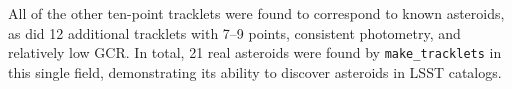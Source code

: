 All of the other ten-point tracklets were found to correspond to known asteroids, as did 12 additional tracklets with 7--9 points, consistent photometry, and relatively low GCR. In total, 21 real asteroids were found by {\tt make\_tracklets} in this single field, demonstrating its ability to discover asteroids in LSST catalogs.
